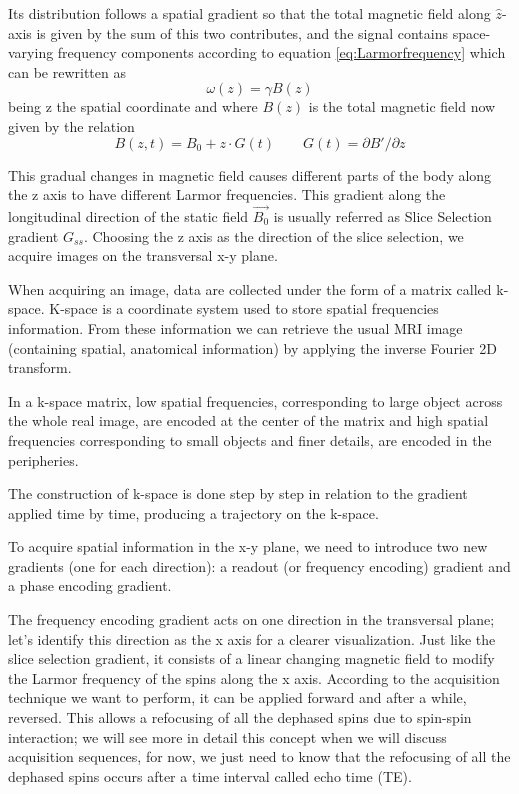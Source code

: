 \documentclass[11pt]{report}
\begin{document}
Its distribution follows a spatial gradient so that the total magnetic field along $\hat z$-axis is given by the sum of this two contributes, and the signal contains space-varying frequency components according to equation \textcolor{ForestGreen}{\ref{eq:Larmorfrequency}} which can be rewritten as
\begin{equation}
\omega(z) = \gamma B(z)
\end{equation}
being z the spatial coordinate and where $B(z)$ is the total magnetic field now given by the relation
\begin{equation}
B(z, t) = B_0 + z\cdot G(t) \qquad G(t) =\partial B'/\partial z
\end{equation}

This gradual changes in magnetic field causes different parts of the body along the z axis to have different Larmor frequencies.
This gradient along the longitudinal direction of the static field $\vec{B_0}$ is usually referred as Slice Selection gradient $G_{ss}$.
Choosing the z axis as the direction of the slice selection, we acquire images on the transversal x-y plane.


When acquiring an image, data are collected under the form of a matrix called k-space.
K-space is a coordinate system used to store spatial frequencies information. From these information we can retrieve the usual MRI image (containing spatial, anatomical information) by applying the inverse Fourier 2D transform.

In a k-space matrix, low spatial frequencies, corresponding to large object across the whole real image, are encoded at the center of the matrix and high spatial frequencies corresponding to small objects and finer details, are encoded in the peripheries.

The construction of k-space is done step by step in relation to the gradient applied time by time, producing a trajectory on the k-space.

To acquire spatial information in the x-y plane, we need to introduce two new gradients (one for each direction): a readout (or frequency encoding) gradient and a phase encoding gradient.

The frequency encoding gradient acts on one direction in the transversal plane; let's identify this direction as the x axis for a clearer visualization.
Just like the slice selection gradient, it consists of a linear changing magnetic field to modify the Larmor frequency of the spins along the x axis. According to the acquisition technique we want to perform, it can be applied forward and after a while, reversed. This allows a refocusing of all the dephased spins due to spin-spin interaction; we will see more in detail this concept when we will discuss acquisition sequences, for now, we just need to know that the refocusing of all the dephased spins occurs after a time interval called echo time (TE).
\end{document}
